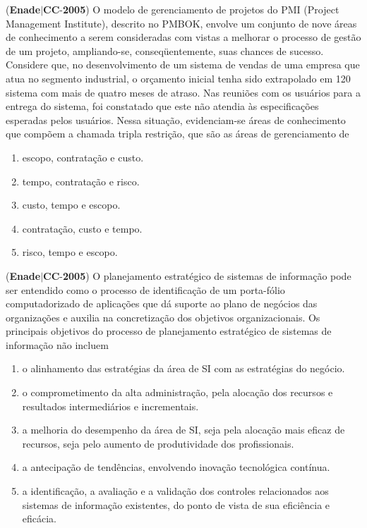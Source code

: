 \documentclass{exam}
\begin{document}
\begin{questions}
\begin{enumerate}[label=\alph*)]
	\end{enumerate}

\question (\textbf{Enade}$|$\textbf{CC}-\textbf{2005}) O modelo de gerenciamento de projetos do PMI
(Project Management Institute), descrito no PMBOK, envolve
um conjunto de nove áreas de conhecimento a serem
consideradas com vistas a melhorar o processo de gestão de
um projeto, ampliando-se, conseqüentemente, suas chances
de sucesso. Considere que, no desenvolvimento de um
sistema de vendas de uma empresa que atua no segmento
industrial, o orçamento inicial tenha sido extrapolado em
120%
sistema com mais de quatro meses de atraso. Nas reuniões
com os usuários para a entrega do sistema, foi constatado que
este não atendia às especificações esperadas pelos usuários.
Nessa situação, evidenciam-se áreas de conhecimento que
compõem a chamada tripla restrição, que são as áreas de
gerenciamento de
	\begin{enumerate}[label=\alph*)]
		\item  escopo, contratação e custo.
		\item  tempo, contratação e risco.
		\item  custo, tempo e escopo.
		\item  contratação, custo e tempo.
		\item  risco, tempo e escopo.

	\end{enumerate}

\question (\textbf{Enade}$|$\textbf{CC}-\textbf{2005}) O planejamento estratégico de sistemas de informação pode ser
entendido como o processo de identificação de um porta-fólio
computadorizado de aplicações que dá suporte ao plano de
negócios das organizações e auxilia na concretização dos objetivos
organizacionais. Os principais objetivos do processo de
planejamento estratégico de sistemas de informação não incluem
	\begin{enumerate}[label=\alph*)]
		\item  o alinhamento das estratégias da área de SI com as estratégias
do negócio.
		\item  o comprometimento da alta administração, pela alocação dos
recursos e resultados intermediários e incrementais.
		\item  a melhoria do desempenho da área de SI, seja pela alocação
mais eficaz de recursos, seja pelo aumento de produtividade
dos profissionais.
		\item  a antecipação de tendências, envolvendo inovação tecnológica
contínua.
		\item  a identificação, a avaliação e a validação dos controles
relacionados aos sistemas de informação existentes, do ponto
de vista de sua eficiência e eficácia.


\end{enumerate}
\end{questions}
\end{document}
